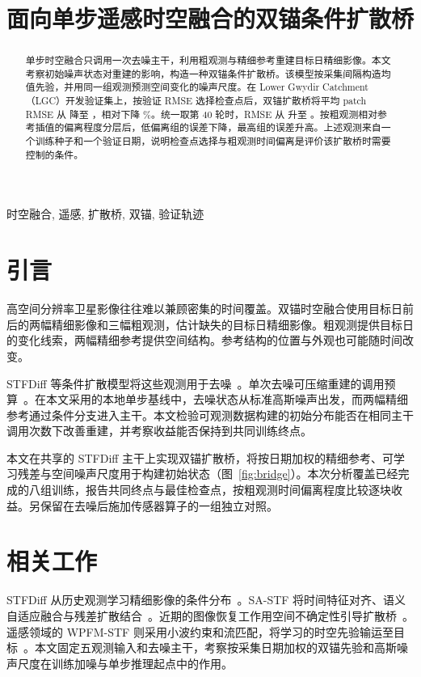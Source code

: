 \documentclass{article}
\title{面向单步遥感时空融合的双锚条件扩散桥}
\begin{document}
\ninept
\maketitle

\begin{abstract}
单步时空融合只调用一次去噪主干，利用粗观测与精细参考重建目标日精细影像。本文考察初始噪声状态对重建的影响，构造一种双锚条件扩散桥。该模型按采集间隔构造均值先验，并用同一组观测预测空间变化的噪声尺度。在 Lower Gwydir Catchment（LGC）开发验证集上，按验证 RMSE 选择检查点后，双锚扩散桥将平均 patch RMSE 从 \BaseBest{} 降至 \BridgeBest{}，相对下降 \BridgeBestGain\%。统一取第 40 轮时，RMSE 从 \BaseEnd{} 升至 \BridgeEnd{}。按粗观测相对参考插值的偏离程度分层后，低偏离组的误差下降，最高组的误差升高。上述观测来自一个训练种子和一个验证日期，说明检查点选择与粗观测时间偏离是评价该扩散桥时需要控制的条件。
\end{abstract}

\begin{keywords}
时空融合, 遥感, 扩散桥, 双锚, 验证轨迹
\end{keywords}

\section{引言}
高空间分辨率卫星影像往往难以兼顾密集的时间覆盖。双锚时空融合使用目标日前后的两幅精细影像和三幅粗观测，估计缺失的目标日精细影像。粗观测提供目标日的变化线索，两幅精细参考提供空间结构。参考结构的位置与外观也可能随时间改变。

STFDiff 等条件扩散模型将这些观测用于去噪~\cite{huang2024stfdiff}。单次去噪可压缩重建的调用预算~\cite{song2021ddim}。在本文采用的本地单步基线中，去噪状态从标准高斯噪声出发，而两幅精细参考通过条件分支进入主干。本文检验可观测数据构建的初始分布能否在相同主干调用次数下改善重建，并考察收益能否保持到共同训练终点。

本文在共享的 STFDiff 主干上实现双锚扩散桥，将按日期加权的精细参考、可学习残差与空间噪声尺度用于构建初始状态（图~\ref{fig:bridge}）。本次分析覆盖已经完成的八组训练，报告共同终点与最佳检查点，按粗观测时间偏离程度比较逐块收益。另保留在去噪后施加传感器算子的一组独立对照。

\section{相关工作}
STFDiff 从历史观测学习精细影像的条件分布~\cite{huang2024stfdiff}。SA-STF 将时间特征对齐、语义自适应融合与残差扩散结合~\cite{zhang2026sastf}。近期的图像恢复工作用空间不确定性引导扩散桥~\cite{tu2026udbm}。遥感领域的 WPFM-STF 则采用小波约束和流匹配，将学习的时空先验输运至目标~\cite{hu2026wpfm}。本文固定五观测输入和去噪主干，考察按采集日期加权的双锚先验和高斯噪声尺度在训练加噪与单步推理起点中的作用。
\end{document}
